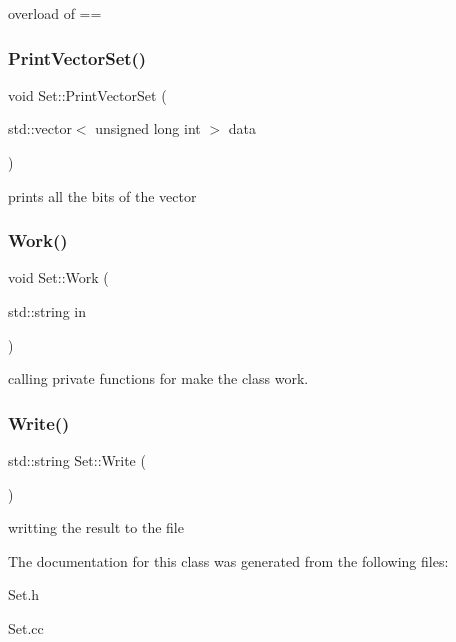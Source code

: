 overload of == \mbox{\label{classSet_a167b6d87b1698a61f269835c34c455cc}} 
\subsubsection{\texorpdfstring{Print\+Vector\+Set()}{PrintVectorSet()}}
{\footnotesize\ttfamily void Set\+::\+Print\+Vector\+Set (\begin{DoxyParamCaption}\item[{std\+::vector$<$ unsigned long int $>$}]{data }\end{DoxyParamCaption})}

prints all the bits of the vector \mbox{\label{classSet_aa25ad5b9d72e4d428eb564b2eb208e3b}} 
\subsubsection{\texorpdfstring{Work()}{Work()}}
{\footnotesize\ttfamily void Set\+::\+Work (\begin{DoxyParamCaption}\item[{std\+::string}]{in }\end{DoxyParamCaption})}

calling private functions for make the class work. \mbox{\label{classSet_afc0f35a8d6903b892bb283813511fea9}} 
\subsubsection{\texorpdfstring{Write()}{Write()}}
{\footnotesize\ttfamily std\+::string Set\+::\+Write (\begin{DoxyParamCaption}{ }\end{DoxyParamCaption})}

writting the result to the file 

The documentation for this class was generated from the following files\+:\begin{DoxyCompactItemize}
\item 
Set.\+h\item 
Set.\+cc\end{DoxyCompactItemize}
